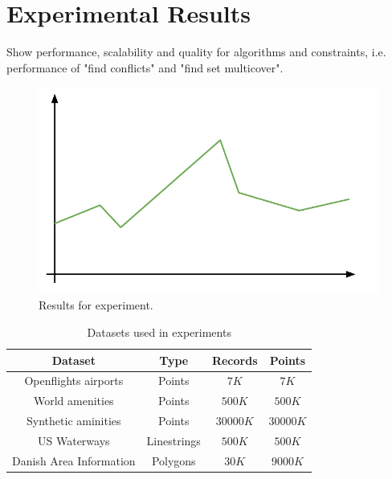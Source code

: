 \section{Experimental Results}


Show performance, scalability and quality for algorithms and constraints, i.e. performance of "find conflicts" and "find set multicover".

\begin{figure}[htbp]
\begin{center}
\includegraphics[scale=.5]{figs/cvl_todo.pdf}
\caption{Results for experiment.}
\label{fig:results-x}
\end{center}
\end{figure}

\begin{table}[htdp]
\caption{Datasets used in experiments}
\begin{center}
\begin{tabular}{|c|c|c|c|}
\hline
\textbf{Dataset} & \textbf{Type} & \textbf{Records} & \textbf{Points} \\
\hline
Openflights airports & Points & $7K$ & $7K$ \\
World amenities & Points & $500K$ & $500K$ \\
Synthetic aminities & Points & $30000K$ & $30000K$ \\
US Waterways & Linestrings & $500K$ & $500K$ \\
Danish Area Information & Polygons & $30K$ & $9000K$ \\
\hline
\end{tabular}
\end{center}
\label{default}
\end{table}%
